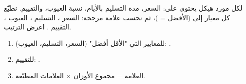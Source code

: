 \begin{statement}
لكل مورد هيكل يحتوي على: السعر، مدة التسليم بالأيام، نسبة العيوب، والتقييم. نطبّع كل معيار إلى \code{[0, 1]} (الأفضل = )، ثم نحسب علامة مرجحة: السعر ، التسليم ، العيوب ، التقييم . اعرض الترتيب.
\end{statement}
\begin{stepsbox}\begin{enumerate}
\item للمعايير التي "الأقل أفضل" (السعر، التسليم، العيوب): .
\item للتقييم: .
\item العلامة = مجموع الأوزان × العلامات المطبّعة.
\end{enumerate}\end{stepsbox}
